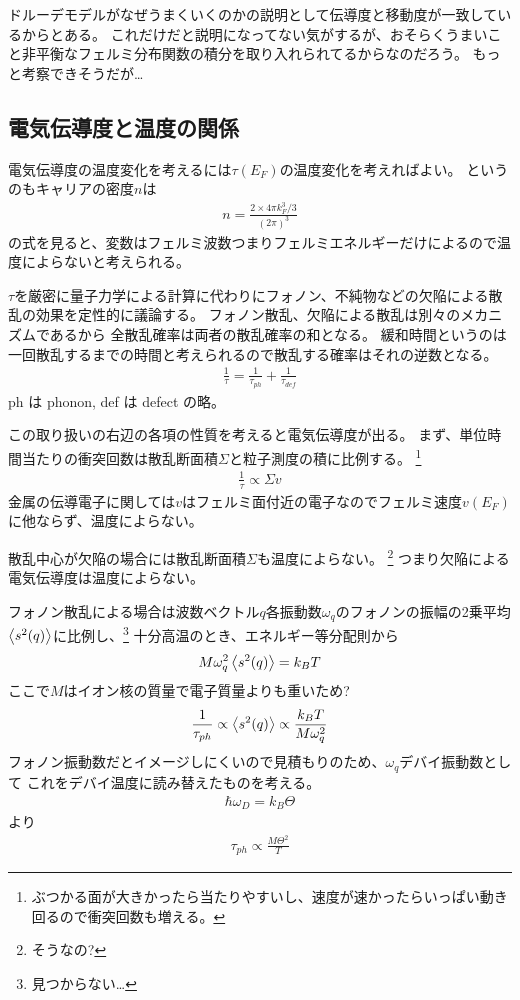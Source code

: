 \documentclass[11pt,dvipdfmx,a4paper]{jsarticle}
\begin{document}
ドルーデモデルがなぜうまくいくのかの説明として伝導度と移動度が一致しているからとある。
これだけだと説明になってない気がするが、おそらくうまいこと非平衡なフェルミ分布関数の積分を取り入れられてるからなのだろう。
もっと考察できそうだが\dots

\subsection{電気伝導度と温度の関係}
電気伝導度の温度変化を考えるには\(\tau(E_F)\)の温度変化を考えればよい。
というのもキャリアの密度\(n\)は
\begin{align}
    n = \frac{2\times 4\pi k_F^3 /3}{(2\pi)^3} %
\end{align}
の式を見ると、変数はフェルミ波数つまりフェルミエネルギーだけによるので温度によらないと考えられる。

\(\tau\)を厳密に量子力学による計算に代わりにフォノン、不純物などの欠陥による散乱の効果を定性的に議論する。
フォノン散乱、欠陥による散乱は別々のメカニズムであるから
全散乱確率は両者の散乱確率の和となる。
緩和時間というのは一回散乱するまでの時間と考えられるので散乱する確率はそれの逆数となる。
\begin{align}
    \frac{1}{\tau} = \frac{1}{\tau_{ph}} +\frac{1}{\tau_{def}} %
\end{align}
ph は phonon, def は defect の略。

この取り扱いの右辺の各項の性質を考えると電気伝導度が出る。
まず、単位時間当たりの衝突回数は散乱断面積\(\Sigma\)と粒子測度の積に比例する。
\footnote{ぶつかる面が大きかったら当たりやすいし、速度が速かったらいっぱい動き回るので衝突回数も増える。}
\begin{align}
    \frac{1}{\tau} \propto \Sigma v
\end{align}
金属の伝導電子に関しては\(v\)はフェルミ面付近の電子なのでフェルミ速度\(v(E_F)\)に他ならず、温度によらない。

散乱中心が欠陥の場合には散乱断面積\(\Sigma\)も温度によらない。
\footnote{そうなの?}
つまり欠陥による電気伝導度は温度によらない。

フォノン散乱による場合は波数ベクトル\(q\)各振動数\(\omega_q\)のフォノンの振幅の2乗平均
\(\ev{s^2(q)}\)に比例し、\footnote{見つからない\dots}
十分高温のとき、エネルギー等分配則から
\begin{align}
    M\omega_q^2\ev{s^2(q)} = k_BT %
\end{align}
ここで\(M\)はイオン核の質量で電子質量よりも重いため?
\begin{align}
    \frac{1}{\tau_{ph}}\propto \ev{s^2(q)}\propto \frac{k_BT}{M\omega_q^2} %
\end{align}
フォノン振動数だとイメージしにくいので見積もりのため、\(\omega_q\)デバイ振動数として
これをデバイ温度に読み替えたものを考える。
\begin{align}
    \hbar \omega_D = k_B \Theta
\end{align}
より
\begin{align}
    \tau_{ph} \propto \frac{M\Theta^2}{T} %
\end{align}
\end{document}
